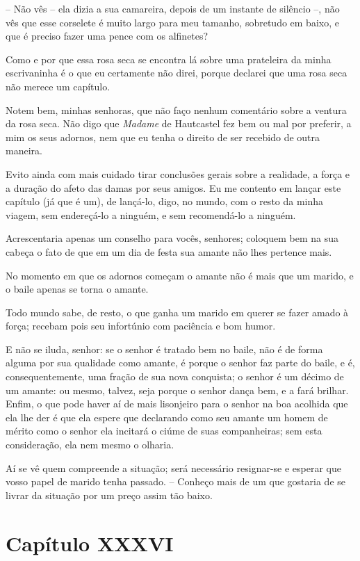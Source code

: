  -- Não vês -- ela dizia a sua camareira, depois de um instante de
silêncio --, não vês que esse corselete é muito largo para meu
tamanho, sobretudo em baixo, e que é preciso fazer uma pence com os
alfinetes?

 Como e por que essa rosa seca se encontra lá sobre uma prateleira da
minha escrivaninha é o que eu certamente não direi, porque declarei que
uma rosa seca não merece um capítulo.

 Notem bem, minhas senhoras, que não faço nenhum comentário sobre a
ventura da rosa seca. Não digo que \textit{Madame} de Hautcastel fez
bem ou mal por preferir, a mim os seus adornos, nem que eu tenha o
direito de ser recebido de outra maneira. 

 Evito ainda com mais cuidado tirar conclusões gerais sobre a realidade,
a força e a duração do afeto das damas por seus amigos. Eu me contento
em lançar este capítulo (já que é um), de lançá-lo, digo, no mundo, com
o resto da minha viagem, sem endereçá-lo a ninguém, e sem recomendá-lo
a ninguém.

 Acrescentaria apenas um conselho para vocês, senhores; coloquem bem na
sua cabeça o fato de que em um dia de festa sua amante não lhes
pertence mais.

 No momento em que os adornos começam o amante não é mais que um marido,
e o baile apenas se torna o amante.

 Todo mundo sabe, de resto, o que ganha um marido em querer se fazer
amado à força; recebam pois seu infortúnio com paciência e bom humor.

 E não se iluda, senhor: se o senhor é tratado bem no baile, não é de
forma alguma por sua qualidade como amante, é porque o senhor faz parte
do baile, e é, consequentemente, uma fração de sua nova conquista; o
senhor é um décimo de um amante: ou mesmo, talvez, seja porque o senhor
dança bem, e a fará brilhar. Enfim, o que pode haver aí de mais
lisonjeiro para o senhor na boa acolhida que ela lhe der é que ela
espere que declarando como seu amante um homem de mérito como o senhor
ela incitará o ciúme de suas companheiras; sem esta consideração, ela
nem mesmo o olharia. 

 Aí se vê quem compreende a situação; será necessário resignar-se e
esperar que vosso papel de marido tenha passado. -- Conheço mais de um
que gostaria de se livrar da situação por um preço assim tão baixo.

\section*{Capítulo XXXVI}

